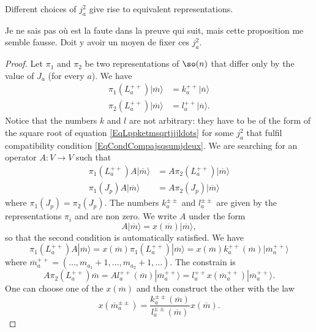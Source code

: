 \begin{proposition}
	Different choices of $j_a^2$ give rise to equivalent representations.
\end{proposition}

\begin{probleme}
	Je ne sais pas où est la faute dans la preuve qui suit, mais cette proposition me semble fausse. Doit y avoir un moyen de fixer ces $j_a^2$.
\end{probleme}

\begin{proof}
	Let $\pi_1$ and $\pi_2$ be two representations of $\so(n)$ that differ only by the value of $J_a$ (for every $a$). We have
	\begin{subequations}
		\begin{align}
			\pi_1(L_a^{++})| \overline{ m } \rangle&=k_a^{++}| \overline{ n } \rangle\\
			\pi_2(L_a^{++})| \overline{ m } \rangle&=l_a^{++}| \overline{ n } \rangle.
		\end{align}
	\end{subequations}
	Notice that the numbers $k$ and $l$ are not arbitrary: they have to be of the form of the square root of equation \eqref{EqLppketmsqrtjjjldots} for some $j_a^2$ that fulfil compatibility condition \eqref{EqCondCompajsqsumjdeux}. We are searching for an operator $A\colon V\to V$ such that 
	\begin{subequations}
		\begin{align}
			\pi_1(L_a^{++})A| \overline{ m } \rangle&= A\pi_2(L_a^{++})| \overline{ m } \rangle\\
			\pi_1(J_p)A| \overline{ m } \rangle&= A\pi_2(J_p)| \overline{ m } \rangle
		\end{align}
	\end{subequations}
	where $\pi_1(J_p)=\pi_2(J_p)$. The numbers $k_a^{\pm\pm}$ and $l_a^{\pm\pm}$ are given by the representations $\pi_i$ and are non zero. We write $A$ under the form
	\begin{equation}
		A| \overline{ m } \rangle=x(\overline{ m })|\overline{ m } \rangle,
	\end{equation}
	so that the second condition is automatically satisfied. We have
	\begin{equation}
		\pi_1(L_a^{++})A| \overline{ m } \rangle=x(\overline{ m })\pi_1(L_a^{++})| \overline{ m } \rangle=x(\overline{ m })k_a^{++}(\overline{ m })| \overline{ m }_a^{++} \rangle
	\end{equation}
	where $\overline{ m }_a^{++}=(\ldots, m_{a_1}+1,\ldots,m_{a_2}+1,\ldots)$. The constrain is
	\begin{equation}
		A\pi_2(L_a^{++})\overline{ m }=Al_a^{++}(\overline{ m })| \overline{ m }_a^{++} \rangle=l_a^{++}x(\overline{ m }_a^{++})| \overline{ m }_a^{++} \rangle.
	\end{equation}
	One can choose one of the $x(\overline{ m })$ and then construct the other with the law
	\begin{equation}
		x(\overline{ m }_a^{\pm\pm})=\frac{ k_a^{\pm\pm}(\overline{ m }) }{ l_a^{\pm\pm}(\overline{ m }) }x(\overline{ m }).
	\end{equation}
\end{proof}
